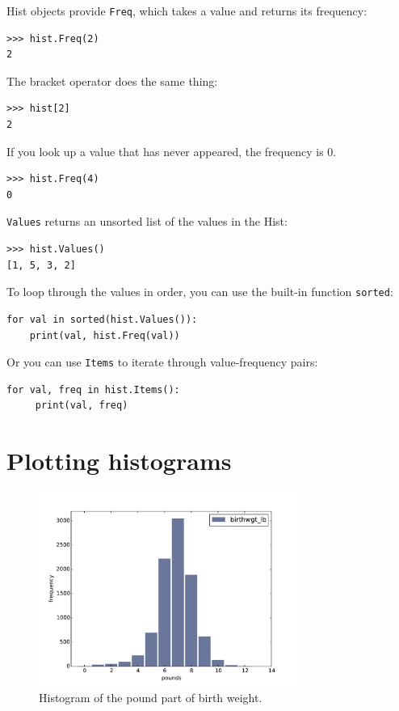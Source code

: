 \documentclass[12pt]{book}
\begin{document}
Hist objects provide {\tt Freq}, which takes a value and
returns its frequency: 
%
\begin{verbatim}
>>> hist.Freq(2)
2
\end{verbatim}

The bracket operator does the same thing: 
%
\begin{verbatim}
>>> hist[2]
2
\end{verbatim}

If you look up a value that has never appeared, the frequency is 0.
%
\begin{verbatim}
>>> hist.Freq(4)
0
\end{verbatim}

{\tt Values} returns an unsorted list of the values in the Hist:
%
\begin{verbatim}
>>> hist.Values()
[1, 5, 3, 2]
\end{verbatim}

To loop through the values in order, you can use the built-in function
{\tt sorted}:
%
\begin{verbatim}
for val in sorted(hist.Values()):
    print(val, hist.Freq(val))
\end{verbatim}

Or you can use {\tt Items} to iterate through
value-frequency pairs: 
%
\begin{verbatim}
for val, freq in hist.Items():
     print(val, freq)
\end{verbatim}


\section{Plotting histograms}

\begin{figure}
\centerline{\includegraphics[height=2.5in]{figs/first_wgt_lb_hist.pdf}}
\caption{Histogram of the pound part of birth weight.}
\label{first_wgt_lb_hist}
\end{figure}
\end{document}
